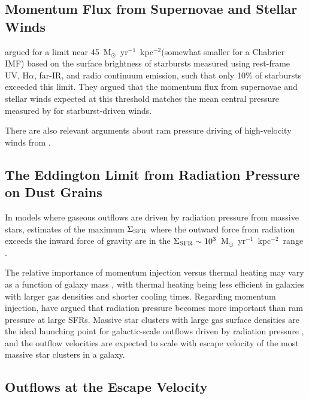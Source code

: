 \documentclass[apj]{emulateapj}
\newcommand{\units}{M$_{\odot}$~yr$^{-1}$~kpc$^{-2}$}
\newcommand{\sigmasfr}{\Sigma_{\textnormal{\scriptsize{SFR}}}}
\begin{document}
\subsection{Momentum Flux from Supernovae and Stellar Winds}

\citet{meu97} argued for a limit near 45~\units (somewhat smaller for
a Chabrier IMF) based on the surface brightness of starbursts measured
using rest-frame UV, H$\alpha$, far-IR, and radio continuum emission,
such that only 10\% of starbursts exceeded this limit.  They argued
that the momentum flux from supernovae and stellar winds expected at
this threshold matches the mean central pressure measured by
\citet{hec90} for starburst-driven winds.

There are also relevant arguments about ram pressure driving of
high-velocity winds from \citet{hec11}.


\subsection{The Eddington Limit from Radiation Pressure on Dust Grains}

In models where gaseous outflows are driven by radiation pressure from
massive stars, estimates of the maximum $\sigmasfr$ where the outward
force from radiation exceeds the inward force of gravity are in the
$\sigmasfr\sim10^3$~\units\ range \citep[e.g.,][]{tho05,hop10}.


The relative importance of momentum injection versus thermal heating
may vary as a function of galaxy mass \citep[e.g.,][]{hop12}, with
thermal heating being less efficient in galaxies with larger gas
densities and shorter cooling times.  Regarding momentum injection,
\citet{sha11} have argued that radiation pressure becomes more
important than ram pressure at large SFRs.  Massive star clusters with
large gas surface densities are the ideal launching point for
galactic-scale outflows driven by radiation pressure
\citep[e.g.,][]{mur11}, and the outflow velocities are expected to
scale with escape velocity of the most massive star clusters in a
galaxy.



\subsection{Outflows at the Escape Velocity}
\end{document}
